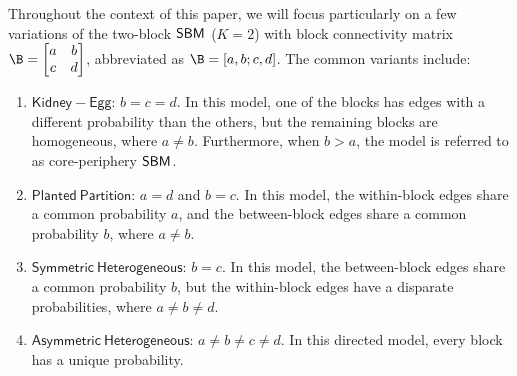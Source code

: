 Throughout the context of this paper, we will focus particularly on a few variations of the two-block $\operatorname{\mathsf{SBM}}$ ($K=2$) with block connectivity matrix $\B = \begin{bmatrix}a & b \\ c & d \end{bmatrix}$, abbreviated as $\B = [a, b; c, d]$. The common variants include:
\begin{enumerate}
    \item $\mathsf{Kidney-Egg}$: $b = c = d$. In this model, one of the blocks has edges with a different probability than the others, but the remaining blocks are homogeneous, where $a \neq b$. Furthermore, when $b > a$, the model is referred to as core-periphery $\operatorname{\mathsf{SBM}}$.
    \item $\mathsf{Planted~Partition}$: $a = d$ and $b = c$. In this model, the within-block edges share a common probability $a$, and the between-block edges share a common probability $b$, where $a \neq b$.
    \item $\mathsf{Symmetric~ Heterogeneous}$: $b = c$. In this model, the between-block edges share a common probability $b$, but the within-block edges have a disparate probabilities, where $a \neq b \neq d$. 
    \item $\mathsf{Asymmetric~ Heterogeneous}$: $a \neq b \neq c \neq d$. In this directed model, every block has a unique probability.

\end{enumerate}
